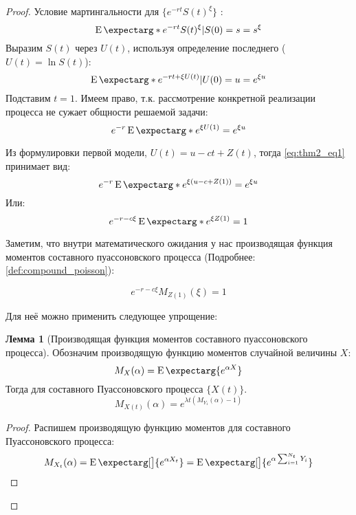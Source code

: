 \documentclass[a4paper,12pt]{article}
\theoremstyle{definition}
\newtheorem{lemma}{Лемма}
\newcommand{\expect}{\operatorname{E}\expectarg}
\begin{document}
\begin{proof}
Условие мартингальности для $\{e^{-rt} S(t)^{\xi}\}$ :
\begin{equation*}
\expect*{e^{-rt} S(t)^{\xi}|S(0) = s} = s^{\xi}
\end{equation*}
Выразим $S(t)$ через $U(t)$, используя определение последнего ($U(t) = \ln{S(t)}$):
\begin{equation*}
\expect*{e^{-rt + \xi U(t)}|U(0) = u} = e^{\xi u}
\end{equation*}
Подставим $t = 1$. Имеем право, т.к. рассмотрение конкретной реализации процесса не сужает общности решаемой задачи:
\begin{equation}\label{eq:thm2_eq1}
e^{-r}\expect*{e^{\xi U(1)}} = e^{\xi u}
\end{equation}

Из формулировки первой модели, $U(t) = u - ct + Z(t)$, тогда \eqref{eq:thm2_eq1} принимает вид:
\begin{equation*}
e^{-r}\expect*{e^{\xi(u - c + Z(1))}} = e^{\xi u}
\end{equation*}
Или:
\begin{equation*}
e^{-r - c \xi} \expect*{e^{\xi Z(1)}} = 1
\end{equation*}

Заметим, что внутри математического ожидания у нас производящая функция моментов составного пуассоновского процесса (Подробнее: \autoref{def:compound_poisson}):

\begin{equation}\label{eq:thm2_eq2}
e^{-r - c \xi} M_{Z(1)}(\xi) = 1
\end{equation}

Для неё можно применить следующее упрощение:

\begin{lemma}[Производящая функция моментов составного пуассоновского процесса]\label{thm:thm2_moment_generating_function}
Обозначим производящую функцию моментов случайной величины $X$:
\begin{equation*}
    M_X(\alpha) = \expect{e^{\alpha X}}
\end{equation*}
Тогда для составного Пуассоновского процесса $\{X(t)\}$.
\begin{equation}\label{eq:moment_generating_for_poisson}
     M_{X(t)}(\alpha) = e^{\lambda t \left(M_{Y_1}(\alpha) - 1\right)}
\end{equation}
\end{lemma}
\begin{proof}
Распишем производящую функцию моментов для составного Пуассоновского процесса:
\begin{equation*}
     M_{X_t}(\alpha) = \expect[\big]{e^{\alpha X_t}} = \expect[\big]{e^{\alpha \sum_{i=1}^{N_t} Y_i}}
\end{equation*}


\end{proof}
\end{proof}
\end{document}
